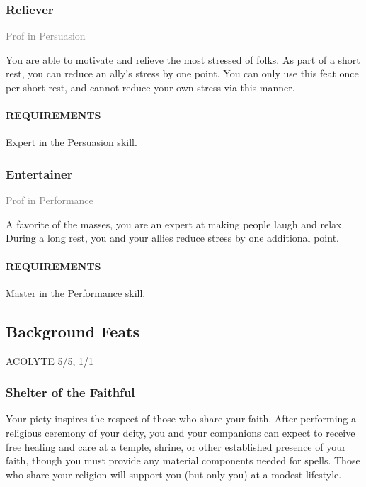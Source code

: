 \subsubsection{Reliever} \label{feat::reliever}
\small{\textcolor{gray}{Prof in Persuasion}}

\normalsize
You are able to motivate and relieve the most stressed of folks.
As part of a short rest, you can reduce an ally's stress by one point.
You can only use this feat once per short rest, and cannot reduce your own stress via this manner.
\paragraph{REQUIREMENTS} Expert in the Persuasion skill.

\subsubsection{Entertainer} \label{feat::entertainer}
\small{\textcolor{gray}{Prof in Performance}}

\normalsize
A favorite of the masses, you are an expert at making people laugh and relax.
During a long rest, you and your allies reduce stress by one additional point.
\paragraph{REQUIREMENTS} Master in the Performance skill.

\subsection*{Background Feats}
ACOLYTE 5/5, 1/1
    \subsubsection{Shelter of the Faithful} \label{feat::shelterofthefaithful}
        Your piety inspires the respect of those who share your faith.
        After performing a religious ceremony of your deity, you and your companions can expect to receive free healing and care at a temple, shrine, or other established presence of your faith, though you must provide any material components needed for spells.
        Those who share your religion will support you (but only you) at a modest lifestyle.

